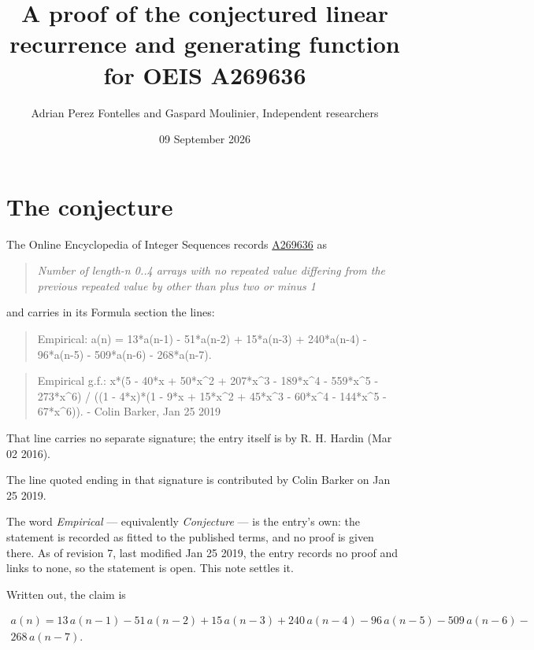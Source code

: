 \documentclass[11pt]{article}
\title{A proof of the conjectured linear recurrence and generating function for OEIS A269636}
\author{Adrian Perez Fontelles and Gaspard Moulinier, Independent researchers}
\date{09 September 2026}
\theoremstyle{definition}
\begin{document}
\maketitle
\section{The conjecture}

The Online Encyclopedia of Integer Sequences records \href{https://oeis.org/A269636}{A269636} as

\begin{quote}\itshape Number of length-n 0..4 arrays with no repeated value differing from the previous repeated value by other than plus two or minus 1\end{quote}

and carries in its Formula section the lines:

\begin{quote}\ttfamily Empirical: a(n) = 13*a(n-1) - 51*a(n-2) + 15*a(n-3) + 240*a(n-4) - 96*a(n-5) - 509*a(n-6) - 268*a(n-7).\end{quote}

\begin{quote}\ttfamily Empirical g.f.: x*(5 - 40*x + 50*x\textasciicircum{}2 + 207*x\textasciicircum{}3 - 189*x\textasciicircum{}4 - 559*x\textasciicircum{}5 - 273*x\textasciicircum{}6) / ((1 - 4*x)*(1 - 9*x + 15*x\textasciicircum{}2 + 45*x\textasciicircum{}3 - 60*x\textasciicircum{}4 - 144*x\textasciicircum{}5 - 67*x\textasciicircum{}6)). - Colin Barker, Jan 25 2019\end{quote}

That line carries no separate signature; the entry itself is by R. H. Hardin (Mar 02 2016).

The line quoted ending in that signature is contributed by Colin Barker on Jan 25 2019.

The word {\itshape Empirical} --- equivalently {\itshape Conjecture} --- is the entry's own: the statement is recorded as fitted to the published terms, and no proof is given there. As of revision 7, last modified Jan 25 2019, the entry records no proof and links to none, so the statement is open. This note settles it.

Written out, the claim is

\begin{multline*} a(n) = 13\,a(n-1) - 51\,a(n-2) + 15\,a(n-3) + 240\,a(n-4) - 96\,a(n-5) - 509\,a(n-6) - \\ 268\,a(n-7). \end{multline*}
\end{document}
